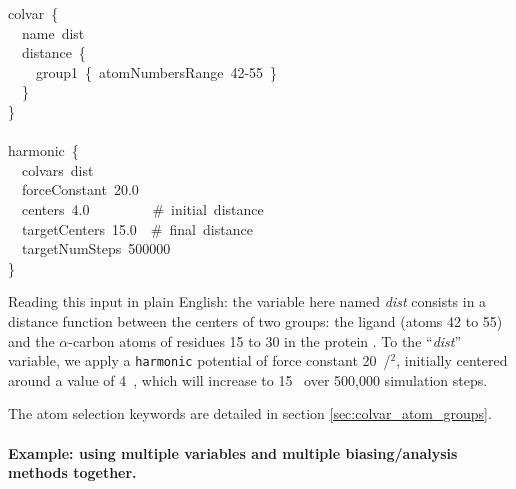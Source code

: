 \begin{cvexampleinput}

colvar~\{\\
\-~~name~dist\\
\-~~distance~\{\\
\-~~~~group1~\{~atomNumbersRange~42-55~\}\\
\-
\-
\-~~\}\\
\-\}\\
\-\\
\-harmonic~\{\\
\-~~colvars~dist\\
\-~~forceConstant~20.0\\
\-~~centers~4.0~~~~~~~~~\#~initial~distance\\
\-~~targetCenters~15.0~~\#~final~distance\\
\-~~targetNumSteps~500000\\
\}
\end{cvexampleinput}

Reading this input in plain English: the variable here named \emph{dist} consists in a distance function between the centers of two groups: the ligand (atoms 42 to 55) and the $\alpha$-carbon atoms of residues 15 to 30 in the protein .
To the ``\emph{dist}'' variable, we apply a \texttt{harmonic} potential of force constant 20~\energyunit/\lengthunit$^2$, initially centered around a value of 4~\lengthunit, which will increase to 15~\lengthunit{} over 500,000 simulation steps.

The atom selection keywords are detailed in section \ref{sec:colvar_atom_groups}.


\paragraph*{Example: using multiple variables and multiple biasing/analysis methods together.}

